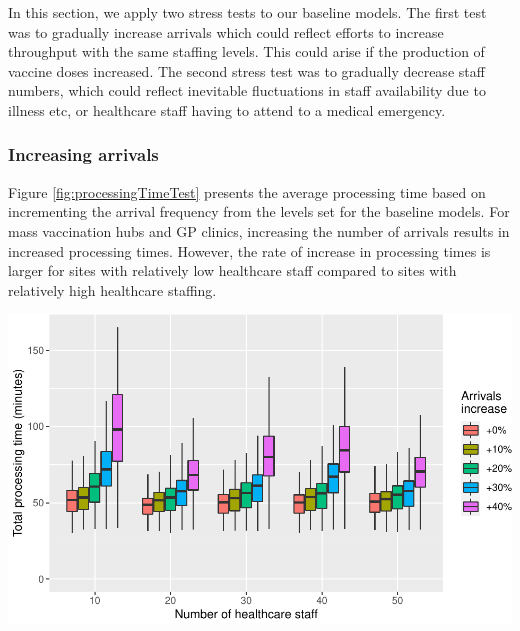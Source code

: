 \documentclass{article}
\let\origfigure\figure
\let\endorigfigure\endfigure
\renewenvironment{figure}[1][2] {
    \expandafter\origfigure\expandafter[H]
} {
    \endorigfigure
}
\begin{document}
In this section, we apply two stress tests to our baseline models. The
first test was to gradually increase arrivals which could reflect
efforts to increase throughput with the same staffing levels. This could
arise if the production of vaccine doses increased. The second stress
test was to gradually decrease staff numbers, which could reflect
inevitable fluctuations in staff availability due to illness etc, or
healthcare staff having to attend to a medical emergency.

\hypertarget{increasing-arrivals}{%
\subsubsection{Increasing arrivals}\label{increasing-arrivals}}

Figure \ref{fig:processingTimeTest} presents the average processing time
based on incrementing the arrival frequency from the levels set for the
baseline models. For mass vaccination hubs and GP clinics, increasing
the number of arrivals results in increased processing times. However,
the rate of increase in processing times is larger for sites with
relatively low healthcare staff compared to sites with relatively high
healthcare staffing.

\begin{figure}

{\centering \includegraphics{Preprint_files/figure-latex/processingTimeTest-1} 

}

\caption{Increase in processing time with increased arrivals by site size for mass vaccination hubs (A) and GP vaccination clinics (B)}\label{fig:processingTimeTest}
\end{figure}
\end{document}
